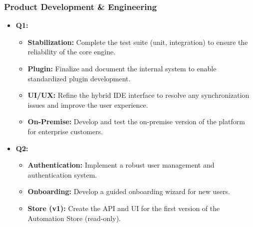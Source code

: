 \documentclass[11pt, a4paper, oneside]{article}
\begin{document}
\subsubsection{Product Development \& Engineering}
\begin{itemize}[leftmargin=*]
    \item \textbf{Q1:}
    \begin{itemize}
        \item \textbf{Stabilization:} Complete the test suite (unit, integration) to ensure the reliability of the core engine.
        \item \textbf{Plugin:} Finalize and document the internal system to enable standardized plugin development.
        \item \textbf{UI/UX:} Refine the hybrid IDE interface to resolve any synchronization issues and improve the user experience.
        \item \textbf{On-Premise:} Develop and test the on-premise version of the platform for enterprise customers.
    \end{itemize}
    \item \textbf{Q2:}
    \begin{itemize}
        \item \textbf{Authentication:} Implement a robust user management and authentication system.
        \item \textbf{Onboarding:} Develop a guided onboarding wizard for new users.
        \item \textbf{Store (v1):} Create the API and UI for the first version of the Automation Store (read-only).
    \end{itemize}
\end{itemize}
\end{document}
